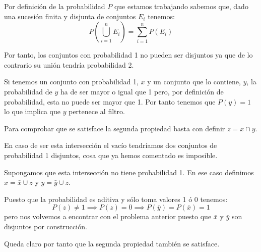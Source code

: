 \begin{problem}
Por definición de la probabilidad $P$ que estamos trabajando sabemos que, dado una sucesión finita y disjunta de conjuntos $E_i$ tenemos:
\[P\left( \bigcup_{i=1}^n E_i\right) = \sum_{i=1}^nP(E_i)\]

Por tanto, los conjuntos con probabilidad 1 no pueden ser disjuntos ya que de lo contrario su unión tendría probabilidad 2.

Si tenemos un conjunto con probabilidad 1, $x$ y un conjunto que lo contiene, $y$, la probabilidad de $y$ ha de ser mayor o igual que 1 pero, por definición de probabilidad, esta no puede ser mayor que 1. Por tanto tenemos que $P(y)=1$ lo que implica que $y$ pertenece al filtro.

Para comprobar que se satisface la segunda propiedad basta con definir $z = x \cap y$.

En caso de ser esta intersección el vacío tendríamos dos conjuntos de probabilidad 1 disjuntos, cosa que ya hemos comentado es imposible.

Supongamos que esta intersección no tiene probabilidad 1. En ese caso definimos $x=\bar{x}\cup z$ y $y=\bar{y}\cup z$.

Puesto que la probabilidad es aditiva y sólo toma valores 1 ó 0 tenemos:
\[P(z) \neq 1 \implies P(z) = 0 \implies P(\bar{y})=P(\bar{x})=1\]
pero nos volvemos a encontrar con el problema anterior puesto que $\bar{x}$ y $\bar{y}$ son disjuntos por construcción.

Queda claro por tanto que la segunda propiedad también se satisface.


\end{problem}

